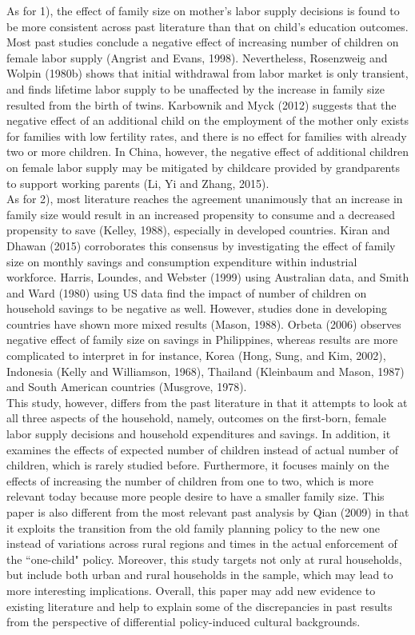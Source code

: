 \documentclass[12pt]{extarticle}
\begin{document}
\indent As for 1), the effect of family size on mother's labor supply decisions is found to be more consistent across past literature than that on child's education outcomes. Most past studies conclude a negative effect of increasing number of children on female labor supply (Angrist and Evans, 1998). Nevertheless, Rosenzweig and Wolpin (1980b) shows that initial withdrawal from labor market is only transient, and finds lifetime labor supply to be unaffected by the increase in family size resulted from the birth of twins. Karbownik and Myck (2012) suggests that the negative effect of an additional child on the employment of the mother only exists for families with low fertility rates, and there is no effect for families with already two or more children. In China, however, the negative effect of additional children on female labor supply may be mitigated by childcare provided by grandparents to support working parents (Li, Yi and Zhang, 2015). \\
\indent As for 2), most literature reaches the agreement unanimously that an increase in family size would result in an increased propensity to consume and a decreased propensity to save (Kelley, 1988), especially in developed countries. Kiran and Dhawan (2015) corroborates this consensus by investigating the effect of family size on monthly savings and consumption expenditure within industrial workforce. Harris, Loundes, and Webster (1999) using Australian data, and Smith and Ward (1980) using US data find the impact of number of children on household savings to be negative as well. However, studies done in developing countries have shown more mixed results (Mason, 1988). Orbeta (2006) observes negative effect of family size on savings in Philippines, whereas results are more complicated to interpret in for instance, Korea (Hong, Sung, and Kim, 2002), Indonesia (Kelly and Williamson, 1968), Thailand (Kleinbaum and Mason, 1987) and South American countries (Musgrove, 1978). \\
\indent This study, however, differs from the past literature in that it attempts to look at all three aspects of the household, namely, outcomes on the first-born, female labor supply decisions and household expenditures and savings. In addition, it examines the effects of expected number of children instead of actual number of children, which is rarely studied before. Furthermore, it focuses mainly on the effects of increasing the number of children from one to two, which is more relevant today because more people desire to have a smaller family size. This paper is also different from the most relevant past analysis by Qian (2009) in that it exploits the transition from the old family planning policy to the new one instead of variations across rural regions and times in the actual enforcement of the ``one-child" policy. Moreover, this study targets not only at rural households, but include both urban and rural households in the sample, which may lead to more interesting implications. Overall, this paper may add new evidence to existing literature and help to explain some of the discrepancies in past results from the perspective of differential policy-induced cultural backgrounds.
\end{document}
